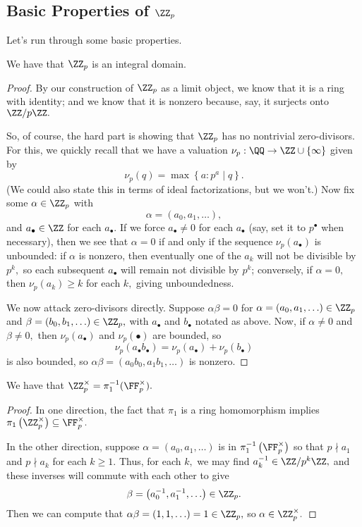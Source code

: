 \documentclass[../notes.tex]{subfiles}
\begin{document}
\subsection{Basic Properties of \texorpdfstring{$\ZZ_p$}{}}
Let's run through some basic properties.
\begin{proposition}
	We have that $\ZZ_p$ is an integral domain.
\end{proposition}
\begin{proof}
	By our construction of $\ZZ_p$ as a limit object, we know that it is a ring with identity; and we know that it is nonzero because, say, it surjects onto $\ZZ/p\ZZ.$

	So, of course, the hard part is showing that $\ZZ_p$ has no nontrivial zero-divisors. For this, we quickly recall that we have a valuation $\nu_p:\QQ\to\ZZ\cup\{\infty\}$ given by
	\[\nu_p(q)=\max\left\{a:p^a\mid q\right\}.\]
	(We could also state this in terms of ideal factorizations, but we won't.) Now fix some $\alpha\in\ZZ_p$ with
	\[\alpha=(a_0,a_1,\ldots),\]
	and $a_\bullet\in\ZZ$ for each $a_\bullet.$ If we force $a_\bullet\ne0$ for each $a_\bullet$ (say, set it to $p^\bullet$ when necessary), then we see that $\alpha=0$ if and only if the sequence $\nu_p(a_\bullet)$ is unbounded: if $\alpha$ is nonzero, then eventually one of the $a_k$ will not be divisible by $p^k,$ so each subsequent $a_\bullet$ will remain not divisible by $p^k$; conversely, if $\alpha=0,$ then $\nu_p(a_k)\ge k$ for each $k,$ giving unboundedness.

	We now attack zero-divisors directly. Suppose $\alpha\beta=0$ for $\alpha=(a_0,a_1,\ldots)\in\ZZ_p$ and $\beta=(b_0,b_1,\ldots)\in\ZZ_p,$ with $a_\bullet$ and $b_\bullet$ notated as above. Now, if $\alpha\ne0$ and $\beta\ne0,$ then $\nu_p(a_\bullet)$ and $\nu_p(\bullet)$ are bounded, so
	\[\nu_p(a_\bullet b_\bullet)=\nu_p(a_\bullet)+\nu_p(b_\bullet)\]
	is also bounded, so $\alpha\beta=(a_0b_0,a_1b_1,\ldots)$ is nonzero.
\end{proof}
\begin{proposition}
	We have that $\ZZ_p^\times=\pi_1^{-1}(\FF_p^\times).$
\end{proposition}
\begin{proof}
	In one direction, the fact that $\pi_1$ is a ring homomorphism implies $\pi_1\left(\ZZ_p^\times\right)\subseteq\FF_p^\times.$

	In the other direction, suppose $\alpha=(a_0,a_1,\ldots)$ is in $\pi_1^{-1}\left(\FF_p^\times\right)$ so that $p\nmid a_1$ and $p\nmid a_k$ for each $k\ge1.$ Thus, for each $k,$ we may find $a_k^{-1}\in\ZZ/p^k\ZZ,$ and these inverses will commute with each other to give
	\[\beta=\left(a_0^{-1},a_1^{-1},\ldots\right)\in\ZZ_p.\]
	Then we can compute that $\alpha\beta=(1,1,\ldots)=1\in\ZZ_p,$ so $\alpha\in\ZZ_p^\times.$
\end{proof}
\end{document}
